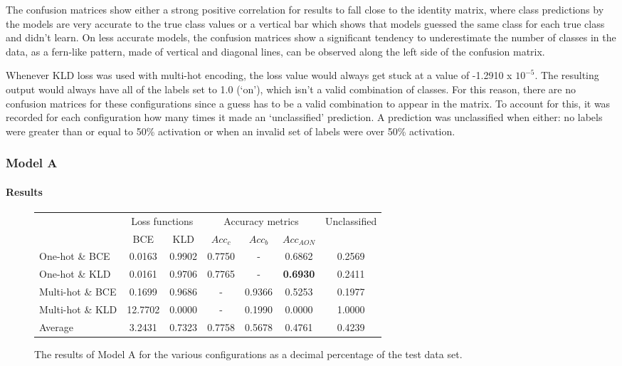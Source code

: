 \documentclass[12pt]{article}
\begin{document}
    The confusion matrices show either a strong positive correlation for results to fall close to the identity matrix, where class predictions by the models are very accurate to the true class values or a vertical bar which shows that models guessed the same class for each true class and didn't learn. On less accurate models, the confusion matrices show a significant tendency to underestimate the number of classes in the data, as a fern-like pattern, made of vertical and diagonal lines, can be observed along the left side of the confusion matrix.\medskip
    
    Whenever KLD loss was used with multi-hot encoding, the loss value would always get stuck at a value of -1.2910 x $10^{-5}$. The resulting output would always have all of the labels set to 1.0 (`on'), which isn't a valid combination of classes. For this reason, there are no confusion matrices for these configurations since a guess has to be a valid combination to appear in the matrix. To account for this, it was recorded for each configuration how many times it made an `unclassified' prediction. A prediction was unclassified when either: no labels were greater than or equal to 50\% activation or when an invalid set of labels were over 50\% activation.\medskip
    
	\subsubsection{Model A}
	\label{sec:evaluation_analysis_modelA}
	
	\paragraph*{Results}
	
	\begin{figure}[H]
	    \centering
	    \begin{tabular}{l|c|c|c|c|c|c|}
	        & \multicolumn{2}{c|}{Loss functions} & \multicolumn{3}{c|}{Accuracy metrics} & \multirow{2}{*}{Unclassified}\\
	        \cline{2-6}
	        & BCE & KLD & $Acc_{c}$ & $Acc_{b}$ & $Acc_{AON}$ & \\
	        \hline
	        One-hot \& BCE & 0.0163 & 0.9902 & 0.7750 & - & 0.6862 & 0.2569\\
	        \hline
	        One-hot \& KLD & 0.0161 & 0.9706 & 0.7765 & - & \textbf{0.6930} & 0.2411\\
	        \hline
	        Multi-hot \& BCE & 0.1699 & 0.9686 & - & 0.9366 & 0.5253 & 0.1977\\
	        \hline
	        Multi-hot \& KLD & 12.7702 & 0.0000 & - & 0.1990 & 0.0000 & 1.0000\\
	        \bottomrule
	        Average & 3.2431 & 0.7323 & 0.7758 & 0.5678 & 0.4761 & 0.4239\\
	       \bottomrule
	    \end{tabular}
	    \caption{The results of Model A for the various configurations as a decimal percentage of the test data set.}
	    \label{fig:modelA}
	\end{figure}
	
\end{document}
